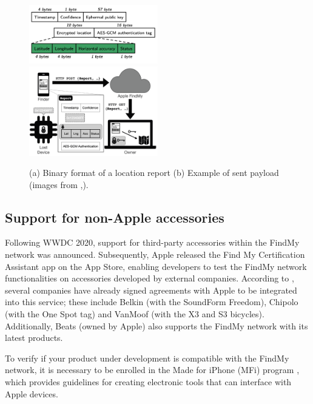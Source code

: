 \documentclass[english]{article}
\begin{document}
\begin{figure}
	\centering
	\includegraphics[width=0.5\textwidth]{images/packet.png}\hfill 
	\includegraphics[width=0.5\textwidth]{images/findmysec.png}
	\caption{(a) Binary format of a location report \quad (b) Example of sent payload (images from \cite{whocanfind},\cite{airguard}).}
	\label{comparison}
\end{figure}

\subsection{Support for non-Apple accessories} 
Following WWDC 2020, support for third-party accessories within the FindMy network was announced. Subsequently, Apple released the Find My Certification Assistant app on the App Store, enabling developers to test the FindMy network functionalities on accessories developed by external companies. According to \cite{Bowe_2022}, several companies have already signed agreements with Apple to be integrated into this service; these include Belkin (with the SoundForm Freedom), Chipolo (with the One Spot tag) and VanMoof (with the X3 and S3 bicycles). Additionally, Beats (owned by Apple) also supports the FindMy network with its latest products.

To verify if your product under development is compatible with the FindMy network, it is necessary to be enrolled in the Made for iPhone (MFi) program \cite{MFIprogram}, which provides guidelines for creating electronic tools that can interface with Apple devices.
\end{document}
